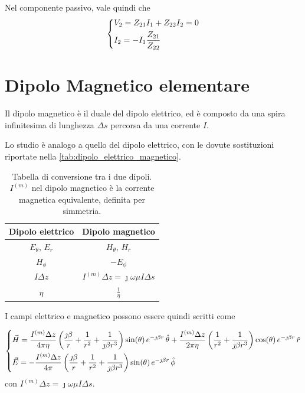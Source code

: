 Nel componente passivo, vale quindi che
\begin{equation}
	\begin{dcases}
		V_2 = Z_{21}I_1+Z_{22}I_2 = 0 \\
		I_2 = -I_1 \frac{Z_{21}}{Z_{22}}
	\end{dcases}
\end{equation}




\clearpage
\section{Dipolo Magnetico elementare}

Il dipolo magnetico è il duale del dipolo elettrico, ed è composto da una spira infinitesima di lunghezza $\Delta s$ percorsa da una corrente $I$.

Lo studio è analogo a quello del dipolo elettrico, con le dovute sostituzioni riportate nella \autoref{tab:dipolo_elettrico_magnetico}.

\begin{table}[h]
	\centering
	\begin{tabular}{cc}
		\toprule
		Dipolo elettrico & Dipolo magnetico \\
		\midrule
		$E_{\theta}$, $E_{r}$ & $H_{\theta}$, $H_{r}$ \\
		$H_{\phi}$ & $-E_{\phi}$ \\
		$I \Delta z$ & $I^{(m)} \Delta z =  \jmath \omega \mu I \Delta s$ \\
		$\eta$ & $\frac{1}{\eta}$ \\
		\bottomrule
	\end{tabular}
	\caption{Tabella di conversione tra i due dipoli. $I^{(m)}$ nel dipolo magnetico è la corrente magnetica equivalente, definita per simmetria.}
	\label{tab:dipolo_elettrico_magnetico}
\end{table}

I campi elettrico e magnetico possono essere quindi scritti come

\begin{equation}
	\begin{dcases}
		\vec{H}
		= \frac{I^{(m)} \Delta z}{4 \pi \eta}
		\left(
			\frac{\jmath \beta}{r} + \frac{1}{r^2}
			+ \frac{1}{\jmath \beta r^3}
		\right)
		\sin (\theta) \, e^{-\jmath \beta r} \,\hat{\theta}
		+ \frac{I^{(m)} \Delta z}{2 \pi \eta}
		\left(
			\frac{1}{r^2} + \frac{1}{\jmath \beta r^3}
		\right)
		\cos (\theta) \, e^{-\jmath \beta r} \,\hat{r} \\
		\vec{E}
		= - \frac{I^{(m)} \Delta z}{4 \pi}
		\left(
			\frac{\jmath \beta}{r}
			+ \frac{1}{r^2}
			+ \frac{1}{\jmath \beta r^3}
		\right)
		\sin (\theta) \, e^{-\jmath \beta r} \,\hat{\phi}
	\end{dcases}
\end{equation}
con $I^{(m)} \Delta z = \jmath \omega \mu I \Delta s$.


